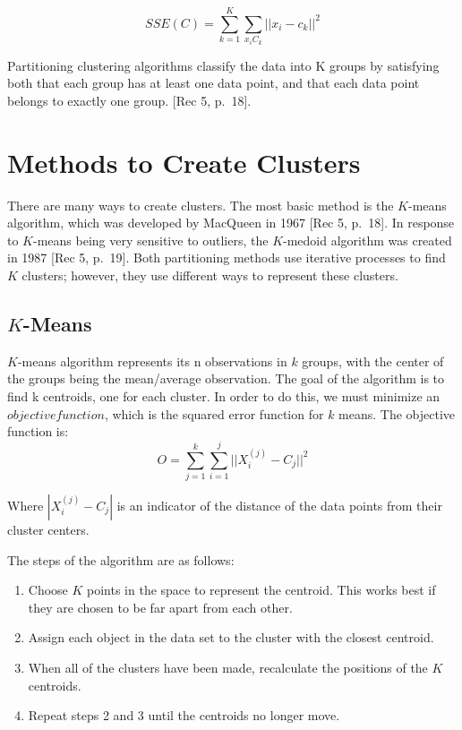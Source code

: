 \documentclass[12pt,twoside]{amherstthesis}
\begin{document}
  \[SSE(C)= \sum_{k=1}^K \sum_{x_{i}C_{k}} ||{x_i}- c_k||^2\]
  
  Partitioning clustering algorithms classify the data into K groups by
  satisfying both that each group has at least one data point, and that
  each data point belongs to exactly one group. {[}Rec 5, p.~18{]}.
  
  \section{Methods to Create Clusters}\label{methods-to-create-clusters}
  
  There are many ways to create clusters. The most basic method is the
  \(K\)-means algorithm, which was developed by MacQueen in 1967 {[}Rec 5,
  p.~18{]}. In response to \(K\)-means being very sensitive to outliers,
  the \(K\)-medoid algorithm was created in 1987 {[}Rec 5, p.~19{]}. Both
  partitioning methods use iterative processes to find \(K\) clusters;
  however, they use different ways to represent these clusters.
  
  \subsection{\texorpdfstring{\(K\)-Means}{K-Means}}\label{k-means}
  
  \(K\)-means algorithm represents its n observations in \(k\) groups,
  with the center of the groups being the mean/average observation. The
  goal of the algorithm is to find k centroids, one for each cluster. In
  order to do this, we must minimize an \(objective function\), which is
  the squared error function for \(k\) means. The objective function is:
  \[O= \sum_{j=1}^k \sum_{i=1}^j ||{{X_i^{(j)}- C_j}}||^2\]
  
  Where \(|{{X_i^{(j)}- C_j}}|\) is an indicator of the distance of the
  data points from their cluster centers.
  
  The steps of the algorithm are as follows:
  
  \begin{enumerate}
  \def\labelenumi{\arabic{enumi}.}
  \item
    Choose \(K\) points in the space to represent the centroid. This works
    best if they are chosen to be far apart from each other.
  \item
    Assign each object in the data set to the cluster with the closest
    centroid.
  \item
    When all of the clusters have been made, recalculate the positions of
    the \(K\) centroids.
  \item
    Repeat steps 2 and 3 until the centroids no longer move.
  \end{enumerate}
  
\end{document}
